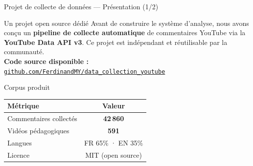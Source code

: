 \documentclass[aspectratio=169, 12pt]{beamer}
\begin{document}
\begin{frame}{Projet de collecte de données — Présentation (1/2)}

  \begin{block}{Un projet open source dédié}
    \normalsize
    Avant de construire le système d'analyse, nous avons conçu un
    \textbf{pipeline de collecte automatique} de commentaires YouTube
    via la \textbf{YouTube Data API v3}. Ce projet est indépendant
    et réutilisable par la communauté.\\[0.5em]
    \textbf{Code source disponible :}\\[0.2em]
    \href{https://github.com/FerdinandMY/data_collection_youtube}
      {\texttt{github.com/FerdinandMY/data\_collection\_youtube}}
  \end{block}

  \vspace{0.4cm}

  \begin{exampleblock}{Corpus produit}
    \centering
    \begin{tabular}{lc}
      \toprule
      \textbf{Métrique} & \textbf{Valeur} \\
      \midrule
      Commentaires collectés & \textbf{42\,860} \\
      Vidéos pédagogiques & \textbf{591} \\
      Langues & FR 65\% · EN 35\% \\
      Licence & MIT (open source) \\
      \bottomrule
    \end{tabular}
  \end{exampleblock}

\end{frame}
\end{document}
